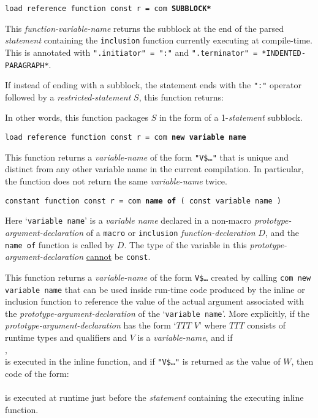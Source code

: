 \documentclass[12pt]{article}
\newcommand{\ttkey}[1]{{\tt \bfseries #1}}
\newenvironment{indpar}[1][0.3in]%
	{\begin{list}{}%
		     {\setlength{\itemsep}{0in}%
		      \setlength{\topsep}{0in}%
		      \setlength{\parsep}{1ex}%
		      \setlength{\labelwidth}{#1}%
		      \setlength{\leftmargin}{#1}%
		      \addtolength{\leftmargin}{\labelsep}}%
	 \item}%
	{\end{list}}
\begin{document}
{\tt load reference function const r = com \ttkey{*SUBBLOCK*} }%
\label{COM-SUBBLOCK}
\begin{indpar}
This {\em function-variable-name} returns the subblock at the end
of the parsed {\em statement}
containing the {\tt inclusion} function currently executing at compile-time.
This is annotated with {\tt ".initiator" = ":"} and
{\tt ".terminator" = *INDENTED-PARAGRAPH*}.

If instead of ending with a subblock, the statement ends with the
{\tt ":"} operator followed by a {\em restricted-statement} $S$,
this function returns: \\

In other words, this function packages $S$ in the form of a 1-{\em statement}
subblock.
\end{indpar}

{\tt load reference function const r = com \ttkey{new variable name} }%
\label{NEW-VARIABLE-NAME}
\begin{indpar}
This function returns a {\em variable-name} of the form {\tt "V\$\ldots"}
that is unique and distinct from any other variable name in the current
compilation.  In particular, the function does not return the same
{\em variable-name} twice.

\end{indpar}

{\tt constant function const r = com \ttkey{name of} ( const variable name )}
\begin{indpar}
Here `{\tt variable name}' is a {\em variable name}
declared in a non-macro {\em prototype-argument-declaration} of a
{\tt macro} or {\tt inclusion} {\em function-declaration} $D$,
and the {\tt name of} function is called by $D$.
The type of the variable
in this {\em proto\-type-argument-declaration} \underline{cannot}
be {\tt const}.

This function returns a {\em variable-name} of the form {\tt V\$\ldots}
created by calling {\tt com new variable name}
that can be used inside run-time code produced by the inline or inclusion
function to reference the value of the actual argument associated with
the {\em prototype-argument-declaration} of the `{\tt variable name}'.
More explicitly,
if the {\em prototype-argument-declara\-tion} has the form `$TTT$ $V$'
where $TTT$ consists of runtime types and qualifiers and $V$ is a
{\em variable-name}, and if \\
\hspace*{1in}{\tt $W$ = name of ( "$V$" )}, \\
is executed in the inline function,
and if {\tt "V\$\ldots"} is returned as the value of $W$,
then code of the form: \\
 \\
is executed at runtime just before the {\em statement} containing
the executing inline function.
\end{indpar}
\end{document}
